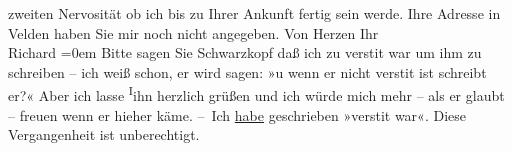 \begin{ledgroupsized}[t]{13cm}
                  zweiten\strikeout{,} Nervosität ob ich bis zu Ihrer Ankunft
                  fertig sein werde. Ihre
               Adresse in Velden haben Sie mir noch nicht
               angegeben. Von Herzen\pend
           \pstart
           Ihr{\\[\baselineskip]}\spacefill\mbox{Richard}\pend
           \leftskip=0em{}\pstart
           \noindent{}Bitte sagen Sie Schwarzkopf daß ich zu
                     versti{\geminationm}t war um ihm zu schreiben – ich weiß schon,
                  er wird sagen: »u wenn er nicht {\pb}versti{\geminationm}t ist schreibt er?« Aber ich lasse \substVorne{}\textsuperscript{I}\substDazwischen{}i\substHinten{}hn herzlich grüßen und ich würde mich mehr – als er glaubt – freuen wenn
                  er hieher käme.\pend
           \pstart
           – Ich \uline{habe} geschrieben »versti{\geminationm}t war«. Diese Vergangenheit ist unberechtigt.\pend
                     \endnumbering{}\end{ledgroupsized}  \newcommand{\dateiname}{L00942}\newcommand{\titel}{Richard Beer-Hofmann an Arthur Schnitzler, 14. 7. 1899}\newcommand{\editorInnen}{Martin Anton Müller und Gerd-Hermann Susen}
      